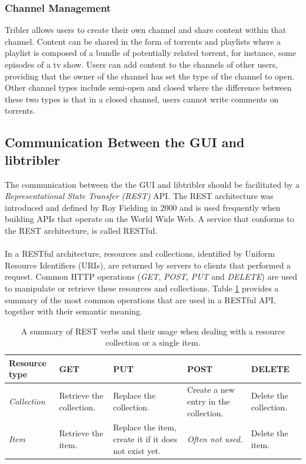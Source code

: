 \subsubsection{\textbf{Channel Management}}
Tribler allows users to create their own channel and share content within that channel. Content can be shared in the form of torrents and playlists where a playlist is composed of a bundle of potentially related torrent, for instance, some episodes of a tv show. Users can add content to the channels of other users, providing that the owner of the channel has set the type of the channel to open. Other channel types include semi-open and closed where the difference between these two types is that in a closed channel, users cannot write comments on torrents.

\subsection{Communication Between the GUI and libtribler}
\label{subsec:communication-gui-libtribler}
The communication between the the GUI and libtribler should be facilitated by a \emph{Representational State Transfer (REST)} API. The REST architecture was introduced and defined by Roy Fielding in 2000\cite{fielding2000fielding} and is used frequently when building APIs that operate on the World Wide Web. A service that conforms to the REST architecture, is called RESTful.\\\\
In a RESTful architecture, resources and collections, identified by Uniform Resource Identifiers (URIs), are returned by servers to clients that performed a request. Common HTTP operations (\emph{GET}, \emph{POST}, \emph{PUT} and \emph{DELETE}) are used to manipulate or retrieve these resources and collections. Table \ref{table:rest-api-operations} provides a summary of the most common operations that are used in a RESTful API, together with their semantic meaning.\\

\begin{table}[h!]
	\centering
	\begin{tabularx}{\textwidth}{|X|X|X|X|X|}
		\hline
		\textbf{Resource type} & \textbf{GET} & \textbf{PUT} & \textbf{POST} & \textbf{DELETE} \\ \hline
		\emph{Collection} & Retrieve the collection. & Replace the collection. & Create a new entry in the collection. & Delete the collection.\\ \hline
		\emph{Item} & Retrieve the item. & Replace the item, create it if it does not exist yet. & \emph{Often not used.} & Delete the item.\\ \hline
	\end{tabularx}
	\caption{A summary of REST verbs and their usage when dealing with a resource collection or a single item.}
	\label{table:rest-api-operations}
\end{table}

